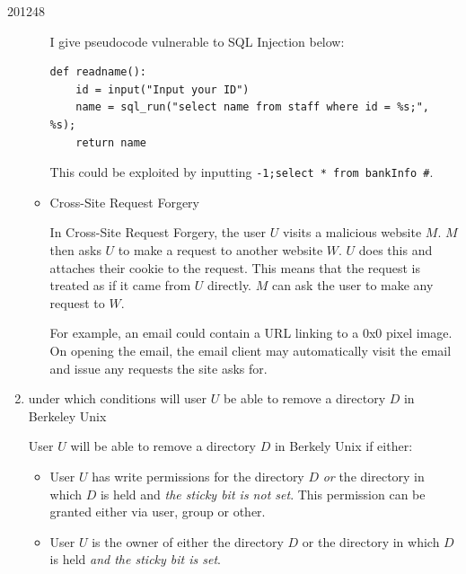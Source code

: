 \documentclass[10pt,\jkfside,a4paper]{article}
\begin{document}
\begin{examquestion}{2012}{4}{8}
\begin{enumerate}
\begin{itemize}
I give pseudocode vulnerable to SQL Injection below:
\begin{lstlisting}
def readname():
	id = input("Input your ID")
	name = sql_run("select name from staff where id = %s;", %s);
	return name
\end{lstlisting}

This could be exploited by inputting
\texttt{-1;select * from bankInfo \#}.

\item Cross-Site Request Forgery

In Cross-Site Request Forgery, the user $U$ visits a malicious website $M$.
$M$ then asks $U$ to make a request to another website $W$. $U$ does
this and attaches their cookie to the request. This means that the request
is treated as if it came from $U$ directly. $M$ can ask the user to make
any request to $W$.

For example, an email could contain a URL linking to a 0x0 pixel image. On
opening the email, the email client may automatically visit the email and
issue any requests the site asks for.

\end{itemize}

\setcounter{enumi}{4}

\item under which conditions will user $U$ be able to remove a directory $D$
in Berkeley Unix

User $U$ will be able to remove a directory $D$ in Berkely Unix if either:
\begin{itemize}

\item User $U$ has write permissions for the directory $D$ \textit{or} the
directory in which $D$ is held and \textit{the sticky bit is not set}. This
permission can be granted either via user, group or other.

\item User $U$ is the owner of either the directory $D$ or the directory in
which $D$ is held \textit{and the sticky bit is set}.

\end{itemize}

\end{enumerate}

\end{examquestion}
\end{document}
